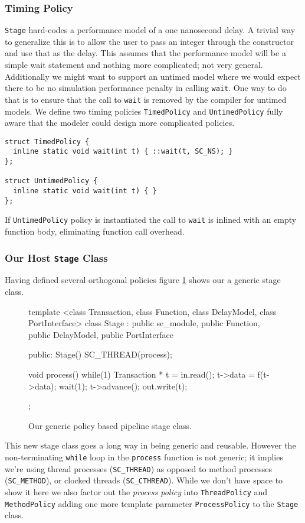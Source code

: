 \documentclass{entcs}
\begin{document}
\subsubsection{Timing Policy}
{\tt Stage} hard-codes a performance model of a one nanosecond delay.
A trivial way
to generalize this is to allow the user to pass an integer through the constructor and use that as
the delay. This assumes that the performance model will be a simple wait statement and nothing more
complicated; not very general. Additionally we might want to support an untimed model where we
would expect there to be no simulation performance penalty in calling {\tt wait}.
One way to do that is to ensure that the call to {\tt wait} is removed by the
compiler for untimed models.
We define two timing policies {\tt TimedPolicy} and
{\tt UntimedPolicy} fully aware that the modeler could design more complicated policies.
\begin{verbatim}
struct TimedPolicy {
  inline static void wait(int t) { ::wait(t, SC_NS); }
};

struct UntimedPolicy {
  inline static void wait(int t) { }
};
\end{verbatim}
If {\tt UntimedPolicy} policy is instantiated
the call to {\tt wait} is inlined with an empty function body, eliminating
function call overhead.

\subsubsection{Our Host {\tt Stage} Class}
Having defined several orthogonal policies figure
\ref{fig:stage} shows our a generic stage class.
\begin{figure}
\centering
\begin{listing}{1}
template <class Transaction,
          class Function,
          class DelayModel,
          class PortInterface>
class Stage : public sc_module,
              public Function,
              public DelayModel,
              public PortInterface {
public:
  Stage() { SC_THREAD(process); }

  void process() {
    while(1) {
      Transaction * t = in.read();
      t->data = f(t->data);
      wait(1);
      t->advance();
      out.write(t);
    }
  }
};
\end{listing}
\caption{\label{fig:stage}Our generic policy based pipeline stage class.}
\end{figure}
This new stage class goes a long way in being generic and reusable. However the non-terminating
{\tt while} loop in the {\tt process} function is not generic; it implies we're using
thread processes ({\tt SC\_THREAD}) as opposed to method processes ({\tt SC\_METHOD}), or
clocked threads ({\tt SC\_CTHREAD}). While we don't have space to show it here we also factor
out the {\em process policy} into {\tt ThreadPolicy} and {\tt MethodPolicy}
adding one more template parameter {\tt ProcessPolicy} to the {\tt Stage} class.
\end{document}
